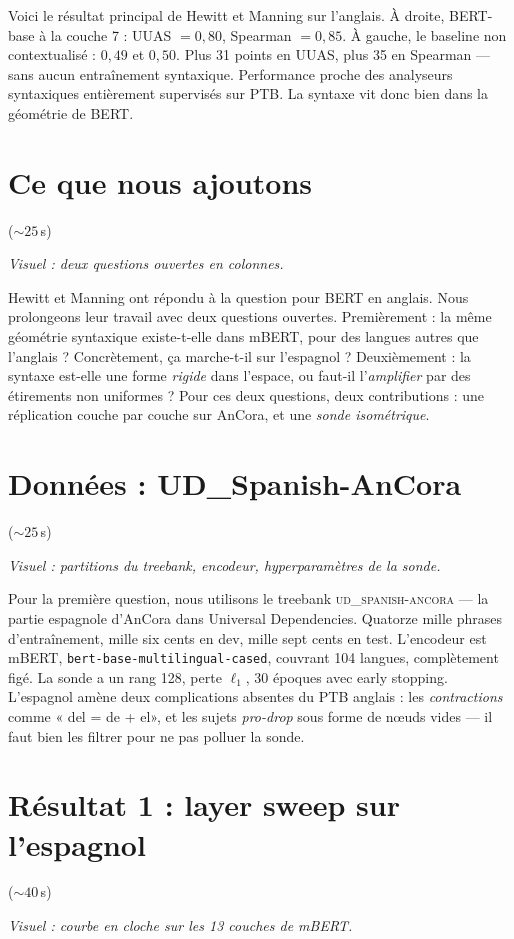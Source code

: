 \documentclass[11pt]{article}
\newcommand{\visuel}[1]{%
  {\footnotesize\color{midgray}\textit{Visuel : #1}\par\vspace{0.3em}}}
\newcommand{\duree}[1]{\hfill{\footnotesize\color{midgray}(${\sim}#1$\,s)}}
\newcommand{\mbert}{m\textsc{BERT}\xspace}
\begin{document}
Voici le résultat principal de Hewitt et Manning sur l'anglais. À
droite, BERT-base à la couche 7 : UUAS $= 0{,}80$, Spearman
$= 0{,}85$. À gauche, le baseline non contextualisé : $0{,}49$ et
$0{,}50$. Plus 31 points en UUAS, plus 35 en Spearman --- sans aucun
entraînement syntaxique. Performance proche des analyseurs
syntaxiques entièrement supervisés sur PTB. La syntaxe vit donc bien
dans la géométrie de BERT.

\section{Ce que nous ajoutons} \duree{25}
\visuel{deux questions ouvertes en colonnes.}

Hewitt et Manning ont répondu à la question pour BERT en anglais.
Nous prolongeons leur travail avec deux questions ouvertes.
Premièrement : la même géométrie syntaxique existe-t-elle dans
\mbert{}, pour des langues autres que l'anglais ? Concrètement, ça
marche-t-il sur l'espagnol ? Deuxièmement : la syntaxe est-elle une
forme \emph{rigide} dans l'espace, ou faut-il l'\emph{amplifier}
par des étirements non uniformes ? Pour ces deux questions, deux
contributions : une réplication couche par couche sur AnCora, et
une \emph{sonde isométrique}.

\section{Données : UD\_Spanish-AnCora} \duree{25}
\visuel{partitions du treebank, encodeur, hyperparamètres de la sonde.}

Pour la première question, nous utilisons le treebank
\textsc{ud\_spanish-ancora} --- la partie espagnole d'AnCora dans
Universal Dependencies. Quatorze mille phrases d'entraînement, mille
six cents en dev, mille sept cents en test. L'encodeur est \mbert{},
\texttt{bert-base-multilingual-cased}, couvrant 104 langues,
complètement figé. La sonde a un rang 128, perte $\ell_1$, 30 époques
avec early stopping. L'espagnol amène deux complications absentes du
PTB anglais : les \emph{contractions} comme « del = de + el»,
et les sujets \emph{pro-drop} sous forme de n\oe{}uds vides --- il
faut bien les filtrer pour ne pas polluer la sonde.

\section{Résultat 1 : layer sweep sur l'espagnol} \duree{40}
\visuel{courbe en cloche sur les 13 couches de mBERT.}
\end{document}
